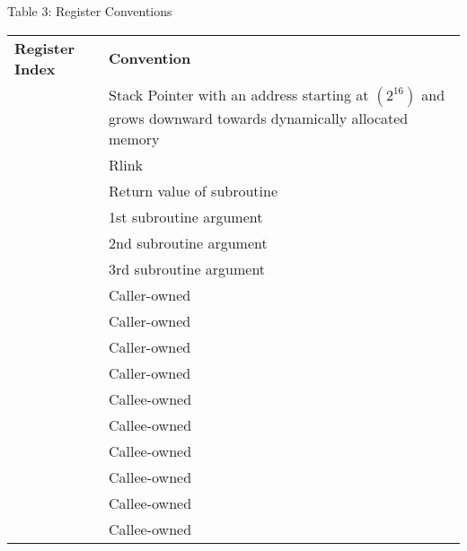 \documentclass{article}
\begin{document}
\large{Table 3: Register Conventions}
\centering
\footnotesize
\renewcommand{\arraystretch}{1.4}
\begin{longtable}{ | l | P{2in} | }
\hline
\textbf{Register Index} & \textbf{Convention} \\ 
 & Stack Pointer with an address starting at  $(2^{16})$ and grows downward towards dynamically allocated memory \\ \hline
{} & Rlink \\ \hline
{} & Return value of subroutine \\ \hline
{} & 1st subroutine argument \\ \hline
{} & 2nd subroutine argument \\ \hline
{} & 3rd subroutine argument \\ \hline
{} & Caller-owned \\ \hline
{} & Caller-owned \\ \hline
{} & Caller-owned \\ \hline
{} & Caller-owned \\ \hline
{} & Callee-owned \\ \hline
{} & Callee-owned \\ \hline
{} & Callee-owned \\ \hline
{} & Callee-owned \\ \hline
{} & Callee-owned \\ \hline
{} & Callee-owned \\ \hline
\end{longtable}
\end{document}
